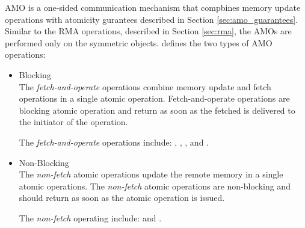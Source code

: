 \label{sec:amo}
\ac{AMO} is a one-sided communication mechanism that compbines memory update operations with atomicity gurantees described in Section \ref{sec:amo_guarantees}. 
Similar to the \ac{RMA} operations, described in Section \ref{sec:rma},
the \acp{AMO} are performed only on the symmetric objects. 
\openshmem{} defines the two types of \ac{AMO} operations:
\begin{itemize}
\item Blocking\\
The \textit{fetch-and-operate} operations combine memory update and fetch 
operations in a single atomic operation.
Fetch-and-operate operations are blocking atomic operation and return as
soon as the fetched is delivered to the initiator of the operation.

The \textit{fetch-and-operate} operations include: , , , and .

\item Non-Blocking\\
The \textit{non-fetch} atomic operations update the remote memory 
in a single atomic operations.
The \textit{non-fetch} atomic operations are non-blocking and should return as
soon as the atomic operation is issued.

The \textit{non-fetch} operating include:  and .
\end{itemize}
